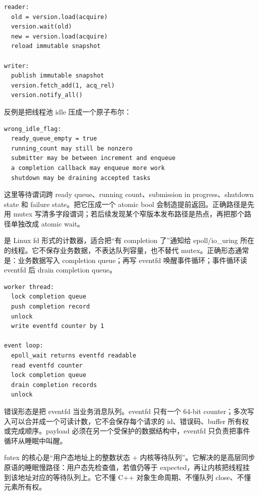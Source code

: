 \begin{lstlisting}[numbers=none,caption={atomic wait 的合适形态}]
reader:
  old = version.load(acquire)
  version.wait(old)
  new = version.load(acquire)
  reload immutable snapshot

writer:
  publish immutable snapshot
  version.fetch_add(1, acq_rel)
  version.notify_all()
\end{lstlisting}

反例是把线程池 idle 压成一个原子布尔：

\begin{lstlisting}[numbers=none,caption={错误：idle 不是单个布尔事实}]
wrong_idle_flag:
  ready_queue_empty = true
  running_count may still be nonzero
  submitter may be between increment and enqueue
  a completion callback may enqueue more work
  shutdown may be draining accepted tasks
\end{lstlisting}

这里等待谓词跨 ready queue、running count、submission in progress、shutdown state 和 failure state。把它压成一个 atomic bool 会制造提前返回。正确路径是先用 mutex 写清多字段谓词；若后续发现某个窄版本发布路径是热点，再把那个路径单独改成 atomic wait。

 是 Linux fd 形式的计数器，适合把“有 completion 了”通知给 epoll/io\_uring 所在的线程。它不保存业务数据，不表达队列容量，也不替代 mutex。正确形态通常是：业务数据写入 completion queue；再写 eventfd 唤醒事件循环；事件循环读 eventfd 后 drain completion queue。

\begin{lstlisting}[numbers=none,caption={eventfd 的正确分层}]
worker thread:
  lock completion queue
  push completion record
  unlock
  write eventfd counter by 1

event loop:
  epoll_wait returns eventfd readable
  read eventfd counter
  lock completion queue
  drain completion records
  unlock
\end{lstlisting}

错误形态是把 eventfd 当业务消息队列。eventfd 只有一个 64-bit counter；多次写入可以合并成一个可读计数，它不会保存每个请求的 id、错误码、buffer 所有权或完成顺序。payload 必须在另一个受保护的数据结构中，eventfd 只负责把事件循环从睡眠中叫醒。

futex 的核心是“用户态地址上的整数状态 + 内核等待队列”。它解决的是高层同步原语的睡眠慢路径：用户态先检查值，若值仍等于 expected，再让内核把线程挂到该地址对应的等待队列上。它不懂 C++ 对象生命周期、不懂队列 close、不懂元素所有权。

